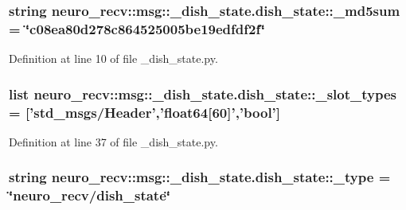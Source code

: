 \subsubsection[{\-\_\-md5sum}]{\setlength{\rightskip}{0pt plus 5cm}string {\bf neuro\-\_\-recv\-::msg\-::\-\_\-dish\-\_\-state.\-dish\-\_\-state\-::\-\_\-md5sum} = \char`\"{}c08ea80d278c864525005be19edfdf2f\char`\"{}\hspace{0.3cm}{\ttfamily  [static, private]}}\label{classneuro__recv_1_1msg_1_1__dish__state_1_1dish__state_ab48b7ea8c128e3dad4c3ddbe9d319818}


\-Definition at line 10 of file \-\_\-dish\-\_\-state.\-py.

\subsubsection[{\-\_\-slot\-\_\-types}]{\setlength{\rightskip}{0pt plus 5cm}list {\bf neuro\-\_\-recv\-::msg\-::\-\_\-dish\-\_\-state.\-dish\-\_\-state\-::\-\_\-slot\-\_\-types} = ['std\-\_\-msgs/\-Header','float64[60]','bool']\hspace{0.3cm}{\ttfamily  [static, private]}}\label{classneuro__recv_1_1msg_1_1__dish__state_1_1dish__state_a46a0da8c56d98cbacff085a06577aeb9}


\-Definition at line 37 of file \-\_\-dish\-\_\-state.\-py.

\subsubsection[{\-\_\-type}]{\setlength{\rightskip}{0pt plus 5cm}string {\bf neuro\-\_\-recv\-::msg\-::\-\_\-dish\-\_\-state.\-dish\-\_\-state\-::\-\_\-type} = \char`\"{}neuro\-\_\-recv/{\bf dish\-\_\-state}\char`\"{}\hspace{0.3cm}{\ttfamily  [static, private]}}\label{classneuro__recv_1_1msg_1_1__dish__state_1_1dish__state_ae82119ac5fb66b9b942c358a4b158fb0}


